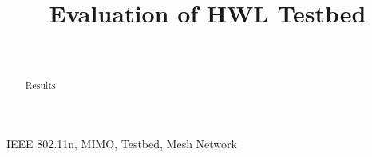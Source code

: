 \documentclass[onecolumn]{IEEEtran}
\begin{document}
\title{Evaluation of HWL Testbed}

\author{ \\
}

\maketitle

\begin{abstract}
Results
\end{abstract}

\begin{IEEEkeywords}
IEEE 802.11n, MIMO, Testbed, Mesh Network
\end{IEEEkeywords}

%
%

\end{document}
